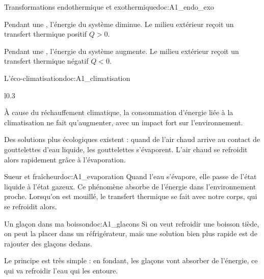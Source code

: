 \begin{doc}{Transformations endothermique et exothermique}{doc:A1_endo_exo}
  \begin{encart}
    \begin{listePoints}
      \item Pendant une , l'énergie du système diminue. 
      Le milieu extérieur reçoit un transfert thermique positif $Q > 0$.
      \item Pendant une , l'énergie du système augmente.
      Le milieu extérieur reçoit un transfert thermique négatif $Q < 0$.
    \end{listePoints}
  \end{encart}
\end{doc}


\newpage
\vspace*{-36pt}
\begin{doc}{L'éco-climatisation}{doc:A1_climatisation}
  \begin{wrapfigure}{l}{0.3\linewidth}
    \vspace*{-15pt}
    \centering
  \end{wrapfigure}
  À cause du réchauffement climatique, la consommation d'énergie liée à la climatisation ne fait qu'augmenter, avec un impact fort sur l'environnement.
  
  Des solutions plus écologiques existent : quand de l'air chaud arrive au contact de gouttelettes d'eau liquide, les gouttelettes s'évaporent.
  L'air chaud se refroidit alors rapidement grâce à l'évaporation.
\end{doc}

\begin{doc}{Sueur et fraîcheur}{doc:A1_evaporation}
  Quand l'eau s'évapore, elle passe de l'état liquide à l'état gazeux.
  Ce phénomène absorbe de l'énergie dans l'environnement proche.
  Lorsqu'on est mouillé, le transfert thermique se fait avec notre corps, qui se refroidit alors.
\end{doc}

\begin{doc}{Un glaçon dans ma boisson}{doc:A1_glacons}
  Si on veut refroidir une boisson tiède, on peut la placer dans un réfrigérateur, mais une solution bien plus rapide est de rajouter des glaçons dedans.
  
  Le principe est très simple : en fondant, les glaçons vont absorber de l'énergie, ce qui va refroidir l'eau qui les entoure.
\end{doc}




